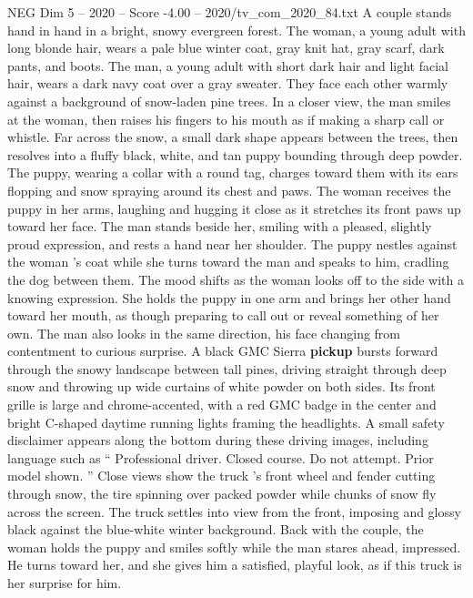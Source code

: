 \begin{textsample}{NEG Dim 5 – 2020 – Score -4.00 – 2020/tv\_com\_2020\_84.txt}  \label{ex:f5_neg_035}
A couple stands hand in hand in a bright, snowy evergreen forest.
The woman, a young adult with long blonde hair, wears a pale blue winter coat, gray knit hat, gray scarf, dark pants, and boots.
The man, a young adult with short dark hair and light facial hair, wears a dark navy coat over a gray sweater.
They face each other warmly against a background of snow-laden pine trees.
In a closer view, the man smiles at the woman, then raises his fingers to his mouth as if making a sharp call or whistle.
Far across the snow, a small dark shape appears between the trees, then resolves into a fluffy black, white, and tan puppy bounding through deep powder.
The puppy, wearing a collar with a round tag, charges toward them with its ears flopping and snow spraying around its chest and paws.
The woman receives the puppy in her arms, laughing and hugging it close as it stretches its front paws up toward her face.
The man stands beside her, smiling with a pleased, slightly proud expression, and rests a hand near her shoulder.
The puppy nestles against the woman ’s coat while she turns toward the man and speaks to him, cradling the dog between them.
The mood shifts as the woman looks off to the side with a knowing expression.
She holds the puppy in one arm and brings her other hand toward her mouth, as though preparing to call out or reveal something of her own.
The man also looks in the same direction, his face changing from contentment to curious surprise.
A black GMC Sierra \textbf{pickup} bursts forward through the snowy landscape between tall pines, driving straight through deep snow and throwing up wide curtains of white powder on both sides.
Its front grille is large and chrome-accented, with a red GMC badge in the center and bright C-shaped daytime running lights framing the headlights.
A small safety disclaimer appears along the bottom during these driving images, including language such as “ Professional driver.
Closed course.
Do not attempt.
Prior model shown. ” Close views show the truck ’s front wheel and fender cutting through snow, the tire spinning over packed powder while chunks of snow fly across the screen.
The truck settles into view from the front, imposing and glossy black against the blue-white winter background.
Back with the couple, the woman holds the puppy and smiles softly while the man stares ahead, impressed.
He turns toward her, and she gives him a satisfied, playful look, as if this truck is her surprise for him.

\end{textsample}
